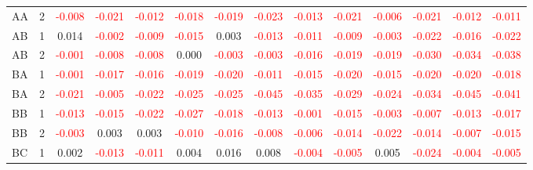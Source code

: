 \begin{table}[!htb]
{\begin{tabular}{llcccccccccccc}
AA & 2 & \textcolor{red}{-0.008} & \textcolor{red}{-0.021} & \textcolor{red}{-0.012} & \textcolor{red}{-0.018} & \textcolor{red}{-0.019} & \textcolor{red}{-0.023} & \textcolor{red}{-0.013} & \textcolor{red}{-0.021} & \textcolor{red}{-0.006} & \textcolor{red}{-0.021} & \textcolor{red}{-0.012} & \textcolor{red}{-0.011}\\
AB & 1 & 0.014 & \textcolor{red}{-0.002} & \textcolor{red}{-0.009} & \textcolor{red}{-0.015} & 0.003 & \textcolor{red}{-0.013} & \textcolor{red}{-0.011} & \textcolor{red}{-0.009} & \textcolor{red}{-0.003} & \textcolor{red}{-0.022} & \textcolor{red}{-0.016} & \textcolor{red}{-0.022}\\
AB & 2 & \textcolor{red}{-0.001} & \textcolor{red}{-0.008} & \textcolor{red}{-0.008} & 0.000 & \textcolor{red}{-0.003} & \textcolor{red}{-0.003} & \textcolor{red}{-0.016} & \textcolor{red}{-0.019} & \textcolor{red}{-0.019} & \textcolor{red}{-0.030} & \textcolor{red}{-0.034} & \textcolor{red}{-0.038}\\
BA & 1 & \textcolor{red}{-0.001} & \textcolor{red}{-0.017} & \textcolor{red}{-0.016} & \textcolor{red}{-0.019} & \textcolor{red}{-0.020} & \textcolor{red}{-0.011} & \textcolor{red}{-0.015} & \textcolor{red}{-0.020} & \textcolor{red}{-0.015} & \textcolor{red}{-0.020} & \textcolor{red}{-0.020} & \textcolor{red}{-0.018}\\
BA & 2 & \textcolor{red}{-0.021} & \textcolor{red}{-0.005} & \textcolor{red}{-0.022} & \textcolor{red}{-0.025} & \textcolor{red}{-0.025} & \textcolor{red}{-0.045} & \textcolor{red}{-0.035} & \textcolor{red}{-0.029} & \textcolor{red}{-0.024} & \textcolor{red}{-0.034} & \textcolor{red}{-0.045} & \textcolor{red}{-0.041}\\
BB & 1 & \textcolor{red}{-0.013} & \textcolor{red}{-0.015} & \textcolor{red}{-0.022} & \textcolor{red}{-0.027} & \textcolor{red}{-0.018} & \textcolor{red}{-0.013} & \textcolor{red}{-0.001} & \textcolor{red}{-0.015} & \textcolor{red}{-0.003} & \textcolor{red}{-0.007} & \textcolor{red}{-0.013} & \textcolor{red}{-0.017}\\
BB & 2 & \textcolor{red}{-0.003} & 0.003 & 0.003 & \textcolor{red}{-0.010} & \textcolor{red}{-0.016} & \textcolor{red}{-0.008} & \textcolor{red}{-0.006} & \textcolor{red}{-0.014} & \textcolor{red}{-0.022} & \textcolor{red}{-0.014} & \textcolor{red}{-0.007} & \textcolor{red}{-0.015}\\
BC & 1 & 0.002 & \textcolor{red}{-0.013} & \textcolor{red}{-0.011} & 0.004 & 0.016 & 0.008 & \textcolor{red}{-0.004} & \textcolor{red}{-0.005} & 0.005 & \textcolor{red}{-0.024} & \textcolor{red}{-0.004} & \textcolor{red}{-0.005}\\

\end{tabular}}
\end{table}
